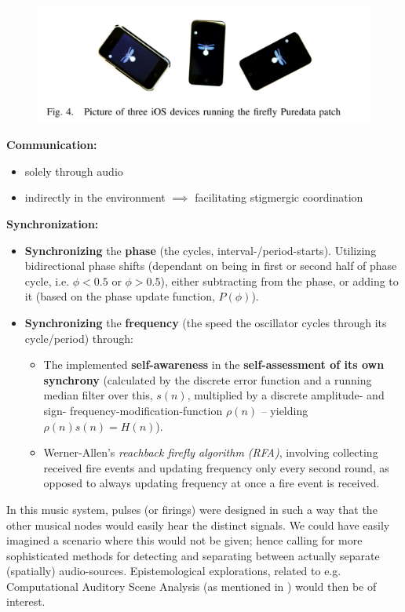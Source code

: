 \documentclass{article}
\begin{document}
\begin{figure}[ht]
\includegraphics[width=\columnwidth]{Assets/pics/firefly_on_ios_device.PNG}
\end{figure}

\textbf{Communication:}
\begin{itemize}
    \item solely through audio
    \item indirectly in the environment $\implies$ facilitating stigmergic coordination
\end{itemize}

\newpage

\textbf{Synchronization:}
\begin{itemize}
    \item \textbf{Synchronizing} the \textbf{phase} (the cycles, interval-/period-starts). Utilizing bidirectional phase shifts (dependant on being in first or second half of phase cycle, i.e. $\phi < 0.5$ or $\phi > 0.5$), either subtracting from the phase, or adding to it (based on the phase update function, $P(\phi)$).
    \item \textbf{Synchronizing} the \textbf{frequency} (the speed the oscillator cycles through its cycle/period) through:
    \begin{itemize}
        \item The implemented \textbf{self-awareness} in the \textbf{self-assessment of its own synchrony} (calculated by the discrete error function and a running median filter over this, $s(n)$, multiplied by a discrete amplitude- and sign- frequency-modification-function $\rho(n)$ -- yielding $\rho(n)s(n) = H(n)$).
        \item Werner-Allen's \textit{reachback firefly algorithm (RFA)}, involving collecting received fire events and updating frequency only every second round, as opposed to always updating frequency at once a fire event is received.
    \end{itemize}
\end{itemize}

In this music system, pulses (or firings) were designed in such a way that the other musical nodes would easily hear the distinct signals. We could have easily imagined a scenario where this would not be given; hence calling for more sophisticated methods for detecting and separating between actually separate (spatially) audio-sources. Epistemological explorations, related to e.g. Computational Auditory Scene Analysis (as mentioned in \cite{casa}) would then be of interest.
\newpage










\end{document}
